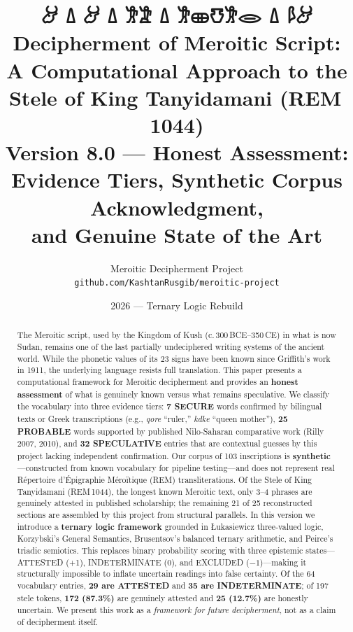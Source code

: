 \documentclass[11pt,a4paper]{article}
\title{%
  \vspace{-1cm}
  {\Large\meroitic 𐦃𐦁 𐦗 𐦑𐦂𐦒𐦈𐦂 𐦗 𐦀𐦂 𐦗 𐦃 𐦗 𐦃}\\[12pt]
  \textbf{Decipherment of Meroitic Script:\\
  A Computational Approach to the\\
  Stele of King Tanyidamani (REM\,1044)}\\[8pt]
  \large{Version 8.0 --- Honest Assessment:\\Evidence Tiers, Synthetic Corpus Acknowledgment,\\and Genuine State of the Art}
}
\author{%
  Meroitic Decipherment Project\\
  \texttt{github.com/KashtanRusgib/meroitic-project}
}
\date{2026 — Ternary Logic Rebuild}
\begin{document}
\maketitle
\thispagestyle{fancy}

\begin{abstract}
\noindent
The Meroitic script, used by the Kingdom of Kush (c.\,300\,BCE--350\,CE) in
what is now Sudan, remains one of the last partially undeciphered writing
systems of the ancient world. While the phonetic values of its 23 signs have
been known since Griffith's work in 1911, the underlying language resists full
translation. This paper presents a computational framework for Meroitic
decipherment and provides an \textbf{honest assessment} of what is genuinely
known versus what remains speculative. We classify the vocabulary into three
evidence tiers: \textbf{7 SECURE} words confirmed by bilingual texts or
Greek transcriptions (e.g., \textit{qore} ``ruler,'' \textit{kdke} ``queen
mother''), \textbf{25 PROBABLE} words supported by published Nilo-Saharan
comparative work (Rilly 2007, 2010), and \textbf{32 SPECULATIVE} entries
that are contextual guesses by this project lacking independent confirmation.
Our corpus of 103 inscriptions is \textbf{synthetic}---constructed from known
vocabulary for pipeline testing---and does not represent real R\'epertoire
d'\'Epigraphie M\'ero\"itique (REM) transliterations. Of the Stele of King
Tanyidamani (REM\,1044), the longest known Meroitic text, only 3--4 phrases
are genuinely attested in published scholarship; the remaining 21 of 25
reconstructed sections are assembled by this project from structural
parallels. In this version we introduce a \textbf{ternary logic framework}
grounded in \L{}ukasiewicz three-valued logic, Korzybski's General Semantics,
Brusentsov's balanced ternary arithmetic, and Peirce's triadic semiotics.
This replaces binary probability scoring with three epistemic states---ATTESTED
(+1), INDETERMINATE (0), and EXCLUDED ($-1$)---making it structurally
impossible to inflate uncertain readings into false certainty.
Of the 64 vocabulary entries, \textbf{29 are ATTESTED} and \textbf{35 are
INDETERMINATE}; of 197 stele tokens, \textbf{172 (87.3\%)} are genuinely
attested and \textbf{25 (12.7\%)} are honestly uncertain.
We present this work as a \textit{framework for future
decipherment}, not as a claim of decipherment itself.
\end{abstract}

\tableofcontents
\newpage

\end{document}
